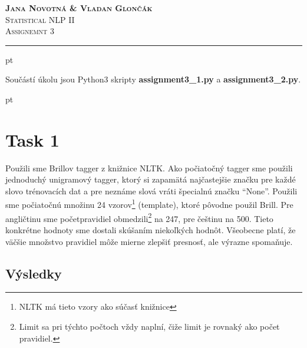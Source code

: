 \documentclass[a4paper, 10.5pt]{article}
\begin{document}
\noindent
\large\textsc{\textbf{Jana Novotná \& Vladan Glončák}}  \\
\normalsize \textsc{Statistical NLP II}\\
\textsc{Assignemnt 3}

\noindent\rule[0.5ex]{\linewidth}{1pt}

\newcommand{\norm}[1]{\left\lVert#1\right\rVert}

 pt

Součástí úkolu jsou Python3 skripty \textbf{assignment3\_1.py} a \textbf{assignment3\_2.py}.

 pt

\section*{Task 1}

Použili sme Brillov tagger z knižnice NLTK.
Ako počiatočný tagger sme použili jednoduchý unigramový tagger, ktorý si  zapamätá najčastejšie značku pre každé slovo trénovacích dat a pre neznáme slová vráti špecialnú značku ``None''.
Použili sme počiatočnú množinu 24 vzorov\footnote{NLTK má tieto vzory ako súčasť knižnice} (template), ktoré pôvodne použil Brill. Pre angličtinu sme početpravidiel obmedzili\footnote{Limit sa pri týchto počtoch vždy naplní, čiže limit je rovnaký ako počet pravidiel.} na 247, pre češtinu na 500.
Tieto konkrétne hodnoty sme dostali skúšaním niekoľkých hodnôt.
Všeobecne platí, že väčšie množstvo pravidiel môže mierne zlepšiť presnosť, ale výrazne spomaňuje.

\subsection*{Výsledky}

\vskip 10pt
\end{document}
